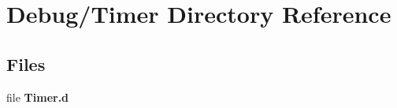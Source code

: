\section{Debug/\+Timer Directory Reference}
\label{dir_16eb3ccd7304ffba555ee05e3fbdde0d}
\subsection*{Files}
\begin{DoxyCompactItemize}
\item 
file {\bfseries Timer.\+d}
\end{DoxyCompactItemize}

